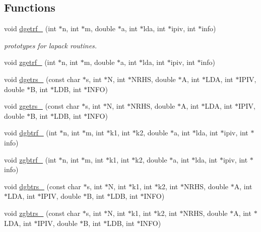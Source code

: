 \subsection*{Functions}
\begin{DoxyCompactItemize}
\item 
void \hyperlink{namespaceodes_af0b7a0203a69c4fa322079ad196cdcae}{dgetrf\+\_\+} (int $\ast$n, int $\ast$m, double $\ast$a, int $\ast$lda, int $\ast$ipiv, int $\ast$info)
\begin{DoxyCompactList}\small\item\em prototypes for lapack routines. \end{DoxyCompactList}\item 
void \hyperlink{namespaceodes_a68cd3ad2ee6d143463ea0a41971b45ca}{zgetrf\+\_\+} (int $\ast$n, int $\ast$m, double $\ast$a, int $\ast$lda, int $\ast$ipiv, int $\ast$info)
\item 
void \hyperlink{namespaceodes_acb38308231063d618ca8f4bfcf8f3912}{dgetrs\+\_\+} (const char $\ast$s, int $\ast$N, int $\ast$N\+R\+H\+S, double $\ast$A, int $\ast$L\+D\+A, int $\ast$I\+P\+I\+V, double $\ast$B, int $\ast$L\+D\+B, int $\ast$I\+N\+F\+O)
\item 
void \hyperlink{namespaceodes_ab6f6bedf50ce1e3b9e01f7cacbd5a9a8}{zgetrs\+\_\+} (const char $\ast$s, int $\ast$N, int $\ast$N\+R\+H\+S, double $\ast$A, int $\ast$L\+D\+A, int $\ast$I\+P\+I\+V, double $\ast$B, int $\ast$L\+D\+B, int $\ast$I\+N\+F\+O)
\item 
void \hyperlink{namespaceodes_a84c781070989698cdb58c37a5074a91c}{dgbtrf\+\_\+} (int $\ast$n, int $\ast$m, int $\ast$k1, int $\ast$k2, double $\ast$a, int $\ast$lda, int $\ast$ipiv, int $\ast$info)
\item 
void \hyperlink{namespaceodes_ae9a95c96e0823f5ac279e572fba93550}{zgbtrf\+\_\+} (int $\ast$n, int $\ast$m, int $\ast$k1, int $\ast$k2, double $\ast$a, int $\ast$lda, int $\ast$ipiv, int $\ast$info)
\item 
void \hyperlink{namespaceodes_a8ef9d46ddb5b78777217d2162ac4470f}{dgbtrs\+\_\+} (const char $\ast$s, int $\ast$N, int $\ast$k1, int $\ast$k2, int $\ast$N\+R\+H\+S, double $\ast$A, int $\ast$L\+D\+A, int $\ast$I\+P\+I\+V, double $\ast$B, int $\ast$L\+D\+B, int $\ast$I\+N\+F\+O)
\item 
void \hyperlink{namespaceodes_ad56f5a1a4c30315e999fb0c3f1be7c24}{zgbtrs\+\_\+} (const char $\ast$s, int $\ast$N, int $\ast$k1, int $\ast$k2, int $\ast$N\+R\+H\+S, double $\ast$A, int $\ast$L\+D\+A, int $\ast$I\+P\+I\+V, double $\ast$B, int $\ast$L\+D\+B, int $\ast$I\+N\+F\+O)

\end{DoxyCompactItemize}
